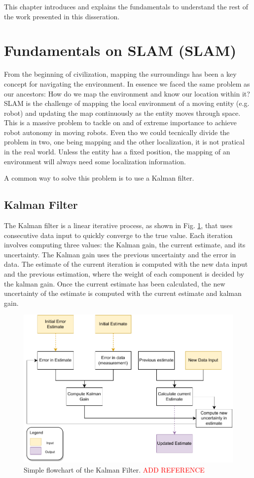 This chapter introduces and explains the fundamentals to understand the rest of the work presented in this disseration.

\section{Fundamentals on \acl*{SLAM} (\acs*{SLAM})}

From the beginning of civilization, mapping the surroundings has been a key concept for navigating the environment. In essence we faced the same problem as our ancestors: How do we map the environment and know our location within it? \acs*{SLAM} is the challenge of mapping the local environment of a moving entity (e.g. robot) and updating the map continuously as the entity moves through space. This is a massive problem to tackle on and of extreme importance to achieve robot autonomy in moving robots. Even tho we could tecnically divide the problem in two, one being mapping and the other localization, it is not pratical in the real world. Unless the entity has a fixed position, the mapping of an environment will always need some localization information.



A common way to solve this problem is to use a Kalman filter.

\subsection{Kalman Filter}
The Kalman filter is a linear iterative process, as shown in Fig. \ref*{fig: flowchart kalman}, that uses consecutive data input to quickly converge to the true value. Each iteration involves computing three values: the Kalman gain, the current estimate, and its uncertainty. The Kalman gain uses the previous uncertainty and the error in data. The estimate of the current iteration is computed with the new data input and the previous estimation, where the weight of each component is decided by the kalman gain. Once the current estimate has been calculated, the new uncertainty of the estimate is computed with the current estimate and kalman gain.

\begin{figure}[H]
    \centering
    \includegraphics[width=0.7\linewidth]{images/background/Kalman-diagram.pdf}
    \caption{Simple flowchart of the Kalman Filter. \textcolor{red}{ADD REFERENCE}}
    \label{fig: flowchart kalman}
\end{figure}

